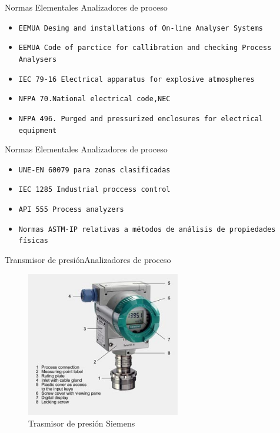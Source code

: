 \documentclass[10pt]{beamer}
\begin{document}
{\begin{frame}{Normas Elementales }{Analizadores de proceso}
\begin{block}{ }
  	\begin{itemize}
    \item {\tt EEMUA Desing and installations of On-line Analyser Systems}
    \item {\tt EEMUA Code of parctice for callibration and checking Process Analysers }
    \item {\tt IEC 79-16 Electrical apparatus for explosive atmospheres}
    \item {\tt NFPA 70.National electrical code,NEC }
    \item {\tt NFPA 496. Purged and pressurized enclosures for electrical equipment  }
    \end{itemize}
	\end{block}  
\end{frame}
\begin{frame}{Normas Elementales }{Analizadores de proceso}
\begin{block}{ }
  	\begin{itemize}
 	 \item {\tt UNE-EN 60079 para zonas clasificadas }
    \item {\tt  IEC 1285 Industrial proccess control }
    \item {\tt API 555 Process analyzers}
    \item {\tt Normas ASTM-IP relativas a métodos de análisis de propiedades físicas}
    \end{itemize}
	\end{block}  
\end{frame}

 \begin{frame}{ Transmisor de presión}{Analizadores de proceso}

 \begin{figure}%
\includegraphics[width=0.6\textwidth]{figura_21.jpg} %
\caption{\label{fig:16} Trasmisor de presión Siemens } %
\end{figure}
\end{frame}

}
\end{document}
